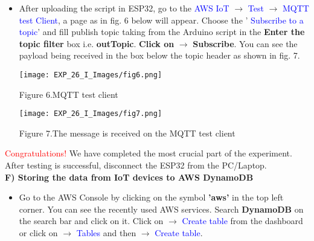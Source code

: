 \documentclass[12pt,a4paper]{article}
\begin{document}
\begin{justify}
\begin{itemize}
\begin{enumerate}
    In \textbf{step C)}, we have downloaded all these files. Open these files with Notepad and copy as it is and keep inside the parenthesis of $ \rightarrow $ \textbf{R"KEY( )KEY"}.
    
    \item PUBLISH\_TOPIC, SUBSCRIBE\_TOPIC  can be changed but keep as it is for time being. In THING\_NAME put the name of the Thing that we created in AWS IoT (\textbf{esp32}).\\[3pt]
    \end{enumerate}
\vspace{-3mm}
\item After uploading the script in ESP32, go to the \textcolor{blue}{AWS IoT} $ \rightarrow $ \textcolor{blue}{Test} $ \rightarrow $ \textcolor{blue}{MQTT test Client}, a page as in fig. 6 below will appear. Choose the ' \textcolor{blue}{Subscribe to a topic}' and fill publish topic taking from the Arduino script in the \textbf{Enter the topic filter} box i.e. \textbf{outTopic}. \textbf{Click on} $ \rightarrow $ \textbf{Subscribe}. You can see the payload being received in the box below the topic header as shown in fig. 7.

\begin{center} 
\texttt{[image: EXP\_26\_I\_Images/fig6.png]}
\end{center}
\vspace{-10mm}
\begin{center} {Figure 6.MQTT test client}\end{center}

\begin{center} 
\texttt{[image: EXP\_26\_I\_Images/fig7.png]}
\end{center}
\vspace{-10mm}
\begin{center} {Figure 7.The message is received on the MQTT test client}\end{center}

\end{itemize}

\noindent \textcolor{red}{Congratulations!} We have completed the most crucial part of the experiment. After testing is successful, disconnect the ESP32 from the PC/Laptop.\\[6pt]

\textbf{F) Storing the data from IoT devices to AWS DynamoDB}
\vspace{-3mm}
\begin{itemize}
 \setlength\itemsep{-0.3em}
\item Go to the AWS Console by clicking on the symbol \textbf{'aws'} in the top left corner. You can see the recently used AWS services.  Search \textbf{DynamoDB} on the search bar and click on it. Click on $ \rightarrow $ \textcolor{blue}{Create table} from the dashboard or click on $ \rightarrow $ \textcolor{blue}{Tables} and then $ \rightarrow $ \textcolor{blue}{Create table}.\par


\end{itemize}
\end{justify}
\end{document}
